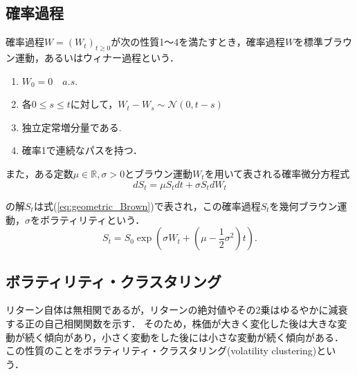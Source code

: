 \documentclass[titlepage]{jsreport}
\begin{document}
\subsection{確率過程}
確率過程$W = (W_t)_{t \geq 0}$が次の性質1～4を満たすとき，確率過程$W$を標準ブラウン運動，あるいはウィナー過程という\cite{stochastic_integration}．
\begin{enumerate}
    \item $W_0 = 0 \quad a.s.$
    \item 各$0 \leq s \leq t$に対して，$W_t - W_s \sim \mathcal{N}(0, t - s)$
    \item 独立定常増分量である.
    \item 確率1で連続なパスを持つ．
\end{enumerate}

また，ある定数$\mu \in \mathbb{R}, \sigma > 0$とブラウン運動$W_t$を用いて表される確率微分方程式
\begin{equation}
    dS_t = \mu S_t dt + \sigma S_t dW_t \label{eq:geoBrow_equation}
\end{equation}

の解$S_t$は式(\ref{eq:geometric_Brown})で表され，この確率過程$S_t$を幾何ブラウン運動，$\sigma$をボラティリティという\cite{Stochastic_Calculus}．
\begin{equation}
    S_t = S_0 \exp{\left(\sigma W_t + \left( \mu - \frac{1}{2}\sigma^2 \right)t\right)}. \label{eq:geometric_Brown}
\end{equation}

\subsection{ボラティリティ・クラスタリング}
リターン自体は無相関であるが，リターンの絶対値やその2乗はゆるやかに減衰する正の自己相関関数を示す\cite{Cont2007}．
そのため，株価が大きく変化した後は大きな変動が続く傾向があり，小さく変動をした後には小さな変動が続く傾向がある\cite{return_correlation}．
この性質のことをボラティリティ・クラスタリング(volatility clustering)という．
\end{document}
